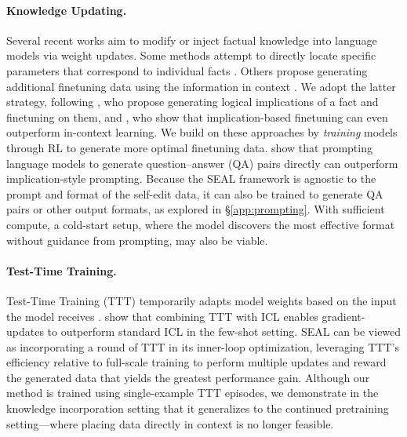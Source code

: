 \documentclass{article}
\newcommand{\methodacronym}{SEAL\xspace}
\begin{document}
\paragraph{Knowledge Updating.}
\label{subsection:ke}
Several recent works aim to modify or inject factual knowledge into language models via weight updates. Some methods attempt to directly locate specific parameters that correspond to individual facts \citep{mitchell2022fastmodeleditingscale,meng2022locating,meng2023masseditingmemorytransformer}. Others propose generating additional finetuning data using the information in context \citep{yehudai2024genie,akyurek2024deductive,yang2025synthetic,lampinen2025generalizationlanguagemodelsincontext,park2025textitnewnewssystem2finetuning}. We adopt the latter strategy, following \citet{akyurek2024deductive}, who propose generating logical implications of a fact and finetuning on them, and \citet{lampinen2025generalizationlanguagemodelsincontext}, who show that implication-based finetuning can even outperform in-context learning. We build on these approaches by \textit{training} models through RL to generate more optimal finetuning data. \citet{park2025textitnewnewssystem2finetuning} show that prompting language models to generate question–answer (QA) pairs directly can outperform implication-style prompting. Because the \methodacronym{} framework is agnostic to the prompt and format of the self-edit data, it can also be trained to generate QA pairs or other output formats, as explored in \S\ref{app:prompting}. With sufficient compute, a cold-start setup, where the model discovers the most effective format without guidance from prompting, may also be viable.

\paragraph{Test-Time Training.} Test-Time Training (TTT) temporarily adapts model weights based on the input the model receives \citep{sun2020test, gandelsman2022test, sun2024TTT, akyurek2025TTT}. \citet{akyurek2025TTT} show that combining TTT with ICL enables gradient-updates to outperform standard ICL in the few-shot setting. \methodacronym can be viewed as incorporating a round of TTT in its inner-loop optimization, leveraging TTT's efficiency relative to full-scale training to perform multiple updates and reward the generated data that yields the greatest performance gain. Although our method is trained using single-example TTT episodes, we demonstrate in the knowledge incorporation setting that it generalizes to the continued pretraining setting---where placing data directly in context is no longer feasible.
\end{document}

